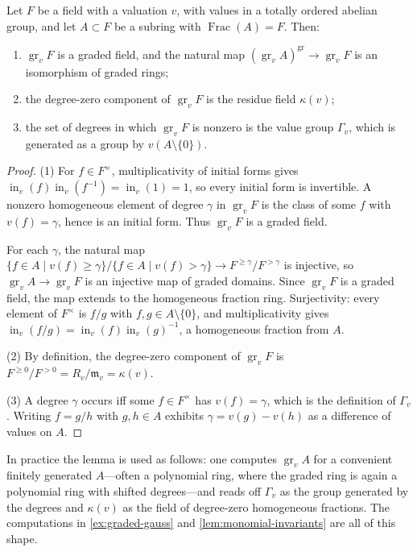\begin{lemma}\label{lem:graded-residue-field}
Let $F$ be a field with a valuation $v$, with values in a totally ordered
abelian group, and let $A\subset F$ be a subring with
$\operatorname{Frac}(A)=F$. Then:
\begin{enumerate}
\item $\operatorname{gr}_vF$ is a graded field, and the natural map
      $(\operatorname{gr}_vA)^{\mathrm{gr}}\to\operatorname{gr}_vF$ is an
      isomorphism of graded rings;
\item the degree-zero component of $\operatorname{gr}_vF$ is the residue
      field $\kappa(v)$;
\item the set of degrees in which $\operatorname{gr}_vF$ is nonzero is the
      value group $\Gamma_v$, which is generated as a group by
      $v(A\setminus\{0\})$.
\end{enumerate}
\end{lemma}
\begin{proof}
(1) For $f\in F^\times$, multiplicativity of initial forms gives
$\operatorname{in}_v(f)\operatorname{in}_v(f^{-1})
=\operatorname{in}_v(1)=1$, so every initial form is invertible. A nonzero
homogeneous element of degree $\gamma$ in $\operatorname{gr}_vF$ is the
class of some $f$ with $v(f)=\gamma$, hence is an initial form. Thus
$\operatorname{gr}_vF$ is a graded field.

For each $\gamma$, the natural map
$\{f\in A\mid v(f)\geq\gamma\}/\{f\in A\mid v(f)>\gamma\}
\to F^{\geq\gamma}/F^{>\gamma}$ is injective, so
$\operatorname{gr}_vA\to\operatorname{gr}_vF$ is an injective map of graded
domains. Since $\operatorname{gr}_vF$ is a graded field, the map extends to
the homogeneous fraction ring. Surjectivity: every element of $F^\times$ is
$f/g$ with $f,g\in A\setminus\{0\}$, and multiplicativity gives
$\operatorname{in}_v(f/g)
=\operatorname{in}_v(f)\operatorname{in}_v(g)^{-1}$, a homogeneous
fraction from $A$.

(2) By definition, the degree-zero component of $\operatorname{gr}_vF$ is
$F^{\geq0}/F^{>0}=R_v/\mathfrak m_v=\kappa(v)$.

(3) A degree $\gamma$ occurs iff some $f\in F^\times$ has $v(f)=\gamma$,
which is the definition of $\Gamma_v$. Writing $f=g/h$ with $g,h\in A$
exhibits $\gamma=v(g)-v(h)$ as a difference of values on $A$.
\end{proof}

In practice the lemma is used as follows: one computes
$\operatorname{gr}_vA$ for a convenient finitely generated $A$---often a
polynomial ring, where the graded ring is again a polynomial ring with
shifted degrees---and reads off $\Gamma_v$ as the group generated by the
degrees and $\kappa(v)$ as the field of degree-zero homogeneous fractions.
The computations in \cref{ex:graded-gauss} and
\cref{lem:monomial-invariants} are all of this shape.

